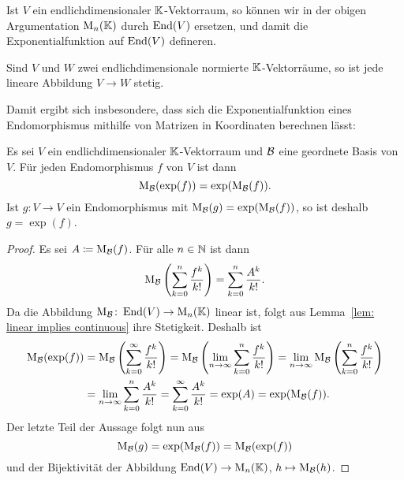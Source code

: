 \documentclass[a4paper, 10pt, numbers=noenddot]{scrartcl}
\begin{document}
Ist $V$ ein endlichdimensionaler $\mathbb{K}$-Vektorraum, so können wir in der obigen Argumentation $\operatorname{M}_n(\mathbb{K})$ durch $\operatorname{End}(V)$ ersetzen, und damit die Exponentialfunktion auf $\operatorname{End}(V)$ defineren.

\begin{lemma}\label{lem: linear implies continuous}
  Sind $V$ und $W$ zwei endlichdimensionale normierte $\mathbb{K}$-Vektorräume, so ist jede lineare Abbildung $V \to W$ stetig.
\end{lemma}

Damit ergibt sich insbesondere, dass sich die Exponentialfunktion eines Endomorphismus mithilfe von Matrizen in Koordinaten berechnen lässt:

\begin{corollary}\label{cor: exponential in coordinates}
  Es sei $V$ ein endlichdimensionaler $\mathbb{K}$-Vektorraum und $\mathcal{B}$ eine geordnete Basis von $V$.
  Für jeden Endomorphismus $f$ von $V$ ist dann
  \[
    \operatorname{M}_{\mathcal{B}}( \exp(f) ) = \exp( \operatorname{M}_{\mathcal{B}}(f) ).
  \]
  Ist $g \colon V \to V$ ein Endomorphismus mit $\operatorname{M}_{\mathcal{B}}(g) = \exp(\operatorname{M}_{\mathcal{B}}(f))$, so ist deshalb $g = \exp(f)$.
\end{corollary}

\begin{proof}
  Es sei $A \coloneqq \operatorname{M}_{\mathcal{B}}(f)$.
  Für alle $n \in \mathbb{N}$ ist dann
  \[
      \operatorname{M}_{\mathcal{B}}\left( \sum_{k=0}^n \frac{f^k}{k!} \right)
    = \sum_{k=0}^n \frac{A^k}{k!}.
  \]
  Da die Abbildung $\operatorname{M}_{\mathcal{B}} \colon \operatorname{End}(V) \to \operatorname{M}_n(\mathbb{K})$ linear ist, folgt aus Lemma~\ref{lem: linear implies continuous} ihre Stetigkeit.
  Deshalb ist
  \begin{align*}
        \operatorname{M}_{\mathcal{B}}( \exp(f) )
    &=  \operatorname{M}_{\mathcal{B}}\left( \sum_{k=0}^{\infty} \frac{f^k}{k!} \right)
     =  \operatorname{M}_{\mathcal{B}}\left( \lim_{n \to \infty} \sum_{k=0}^n \frac{f^k}{k!} \right)
     =  \lim_{n \to \infty} \operatorname{M}_{\mathcal{B}}\left( \sum_{k=0}^n \frac{f^k}{k!} \right) \\
    &=  \lim_{n \to \infty} \sum_{k=0}^n \frac{A^k}{k!}
     =  \sum_{k=0}^\infty \frac{A^k}{k!}
     =  \exp(A)
     =  \exp( \operatorname{M}_{\mathcal{B}}(f) ).
  \end{align*}
  Der letzte Teil der Aussage folgt nun aus
  \[
      \operatorname{M}_{\mathcal{B}}(g)
    = \exp( \operatorname{M}_{\mathcal{B}}(f) )
    = \operatorname{M}_{\mathcal{B}}( \exp(f) )
  \]
  und der Bijektivität der Abbildung $\operatorname{End}(V) \to \operatorname{M}_n(\mathbb{K})$, $h \mapsto \operatorname{M}_{\mathcal{B}}(h)$.
\end{proof}
\end{document}
